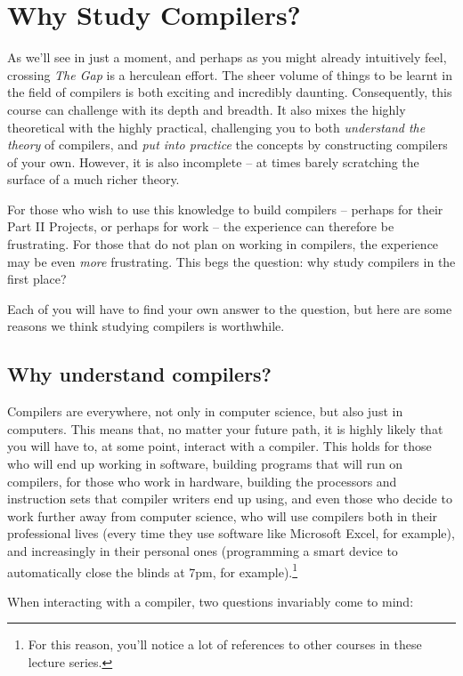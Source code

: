 \section{Why Study Compilers?}
As we'll see in just a moment, and perhaps as you might already intuitively feel, crossing \emph{The Gap} is a herculean effort. The sheer volume of things to be learnt in the field of compilers is both exciting and incredibly daunting. Consequently, this course can challenge with its depth and breadth. It also mixes the highly theoretical with the highly practical, challenging you to both \emph{understand the theory} of compilers, and \emph{put into practice} the concepts by constructing compilers of your own. However, it is also incomplete -- at times barely scratching the surface of a much richer theory.

For those who wish to use this knowledge to build compilers -- perhaps for their Part II Projects, or perhaps for work -- the experience can therefore be frustrating. For those that do not plan on working in compilers, the experience may be even \emph{more} frustrating. This begs the question: why study compilers in the first place?

Each of you will have to find your own answer to the question, but here are some reasons we think studying compilers is worthwhile. 

\subsection{Why understand compilers?}
Compilers are everywhere, not only in computer science, but also just in computers. This means that, no matter your future path, it is highly likely that you will have to, at some point, interact with a compiler. This holds for those who will end up working in software, building programs that will run on compilers, for those who work in hardware, building the processors and instruction sets that compiler writers end up using, and even those who decide to work further away from computer science, who will use compilers both in their professional lives (every time they use software like Microsoft Excel, for example), and increasingly in their personal ones (programming a smart device to automatically close the blinds at 7pm, for example).\footnote{For this reason, you'll notice a lot of references to other courses in these lecture series.}

When interacting with a compiler, two questions invariably come to mind:

